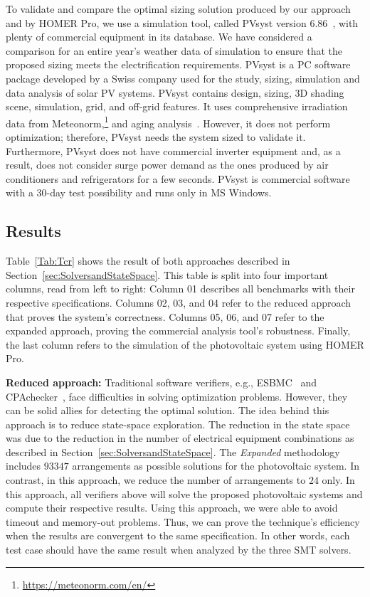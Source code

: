 \documentclass[journal]{IEEEtran}
\begin{document}
To validate and compare the optimal sizing solution produced by our approach and by HOMER Pro, we use a simulation tool, called PVsyst version $6.86$~\cite{PVsyst}, with plenty of commercial equipment in its database. We have considered a comparison for an entire year's weather data of simulation to ensure that the proposed sizing meets the electrification requirements. PVsyst is a PC software package developed by a Swiss company used for the study, sizing, simulation and data analysis of solar PV systems. PVsyst contains design, sizing, 3D shading scene, simulation, grid, and off-grid features. It uses comprehensive irradiation data from Meteonorm,\footnote{\href{https://meteonorm.com/en/}{https://meteonorm.com/en/}} and aging analysis~\cite{PVsyst2017}. However, it does not perform optimization; therefore, PVsyst needs the system sized to validate it. Furthermore, PVsyst does not have commercial inverter equipment and, as a result, does not consider surge power demand as the ones produced by air conditioners and refrigerators for a few seconds. PVsyst is commercial software with a $30$-day test possibility and runs only in MS Windows.

\subsection{Results}

Table~\ref{Tab:Tcr} shows the result of both approaches described in Section~\ref{sec:SolversandStateSpace}. This table is split into four important columns, read from left to right: Column 01 describes all benchmarks with their respective specifications. Columns 02, 03, and 04 refer to the reduced approach that proves the system's correctness. Columns 05, 06, and 07 refer to the expanded approach, proving the commercial analysis tool's robustness. Finally, the last column refers to the simulation of the photovoltaic system using HOMER Pro.

\textbf{Reduced approach:} Traditional software verifiers, e.g., ESBMC~\cite{esbmc2018} and CPAchecker~\cite{Beyer2011}, face difficulties in solving optimization problems. However, they can be solid allies for detecting the optimal solution. The idea behind this approach is to reduce state-space exploration. The reduction in the state space was due to the reduction in the number of electrical equipment combinations as described in Section~\ref{sec:SolversandStateSpace}. The \textit{Expanded} methodology includes $93347$ arrangements as possible solutions for the photovoltaic system.
In contrast, in this approach, we reduce the number of arrangements to $24$ only. In this approach, all verifiers above will solve the proposed photovoltaic systems and compute their respective results. Using this approach, we were able to avoid timeout and memory-out problems. Thus, we can prove the technique's efficiency when the results are convergent to the same specification. In other words, each test case should have the same result when analyzed by the three SMT solvers.
\end{document}

